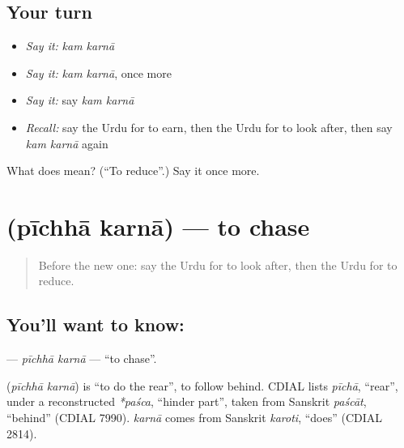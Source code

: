 \subsection*{Your turn}
\begin{itemize}
\raggedright
  \item \emph{Say it:} \emph{kam karnā}
  \item \emph{Say it:} \emph{kam karnā}, once more
  \item \emph{Say it:} say \emph{kam karnā}
  \item \emph{Recall:} say the Urdu for to earn, then the Urdu for to look after, then say \emph{kam karnā} again
\end{itemize}

\begin{tcolorbox}[breakable,colback=teal!4,colframe=teal!35!black,title={Before you move on}]
What does   mean? (\textquotedblleft{}To reduce\textquotedblright{}.) Say it once more.
\end{tcolorbox}
\section[\texorpdfstring{\ur{پیچھا} \ur{کرنا} (pīchhā karnā)}{پیچھا کرنا (pīchhā karnā)}]{  (pīchhā karnā) — to chase}

\label{lesson:UR-C215-pichha-karna}



\begin{quote}
Before the new one: say the Urdu for to look after, then the Urdu for to reduce.
\end{quote}

\subsection*{You'll want to know:  }
\textbf{ } — \emph{pīchhā karnā} — \textquotedblleft{}to chase\textquotedblright{}.

\begin{cousinweb}
\textbf{ } (\emph{pīchhā karnā}) is \textquotedblleft{}to do the rear\textquotedblright{}, to follow behind. CDIAL lists \emph{pīchā}, \textquotedblleft{}rear\textquotedblright{}, under a reconstructed \emph{*paśca}, \textquotedblleft{}hinder part\textquotedblright{}, taken from Sanskrit \emph{paścāt}, \textquotedblleft{}behind\textquotedblright{} (CDIAL 7990). \emph{karnā} comes from Sanskrit \emph{karoti}, \textquotedblleft{}does\textquotedblright{} (CDIAL 2814).
\end{cousinweb}

